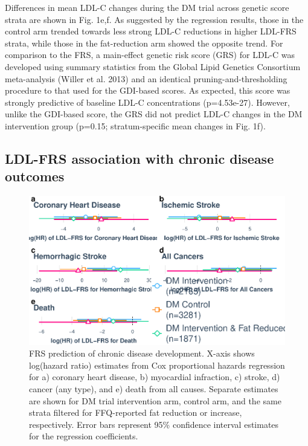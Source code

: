 \documentclass[]{article}
\begin{document}
Differences in mean LDL-C changes during the DM trial across genetic
score strata are shown in Fig. 1e,f. As suggested by the regression
results, those in the control arm trended towards less strong LDL-C
reductions in higher LDL-FRS strata, while those in the fat-reduction
arm showed the opposite trend. For comparison to the FRS, a main-effect
genetic risk score (GRS) for LDL-C was developed using summary
statistics from the Global Lipid Genetics Consortium meta-analysis
(Willer et al. 2013) and an identical pruning-and-thresholding procedure
to that used for the GDI-based scores. As expected, this score was
strongly predictive of baseline LDL-C concentrations (p=4.53e-27).
However, unlike the GDI-based score, the GRS did not predict LDL-C
changes in the DM intervention group (p=0.15; stratum-specific mean
changes in Fig. 1f).

\hypertarget{ldl-frs-association-with-chronic-disease-outcomes}{%
\subsection{LDL-FRS association with chronic disease
outcomes}\label{ldl-frs-association-with-chronic-disease-outcomes}}

\begin{figure}
\centering
\includegraphics{figures/cvd-outcomes-1.pdf}
\caption{FRS prediction of chronic disease development. X-axis shows
log(hazard ratio) estimates from Cox proportional hazards regression for
a) coronary heart disease, b) myocardial infraction, c) stroke, d)
cancer (any type), and e) death from all causes. Separate estimates are
shown for DM trial intervention arm, control arm, and the same strata
filtered for FFQ-reported fat reduction or increase, respectively. Error
bars represent 95\% confidence interval estimates for the regression
coefficients.}
\end{figure}
\end{document}
